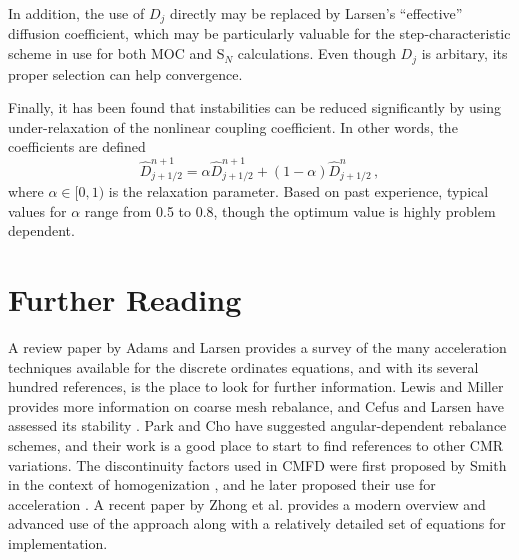 In addition, the use of $D_j$ directly may be replaced by 
Larsen's ``effective'' diffusion coefficient, which may be particularly
valuable for the step-characteristic scheme in use for both MOC and S$_N$
calculations.  Even though $D_j$ is arbitary, its proper selection can 
help convergence.


Finally, it has been found that instabilities can be reduced 
significantly by using under-relaxation of the 
nonlinear coupling coefficient.  In other words,
the coefficients are defined
\begin{equation}
 \hat{D}^{n+1}_{j+1/2} = \alpha \hat{D}^{n+1}_{j+1/2} + (1-\alpha)\hat{D}^{n}_{j+1/2}  \, ,
\end{equation}
where  $\alpha \in [0, 1)$ is the relaxation parameter.  Based on 
past experience, typical values for $\alpha$ range from 0.5 to 0.8, 
though the optimum value is highly problem dependent.





\section*{Further Reading}

A review paper by Adams and Larsen \cite{adams2002fim} provides a survey of the 
many acceleration techniques available for the discrete ordinates equations, and 
with its several hundred references, is the place to look for further 
information.  Lewis and Miller provides more information on coarse mesh 
rebalance, and Cefus and Larsen have assessed its stability \cite{cefus1990sac}. 
 Park and Cho \cite{park2004cma} have suggested angular-dependent rebalance 
schemes, and their work is a good place to start to find references to other CMR 
variations.  The discontinuity factors used in CMFD were first proposed by Smith 
in the context of homogenization \cite{smith1980shm}, and he later proposed 
their use for acceleration \cite{smith1983nms}. A recent paper by Zhong et al. 
\cite{zhong2008itl} provides a modern overview and advanced use of the approach 
along with a relatively detailed set of equations for implementation.  



